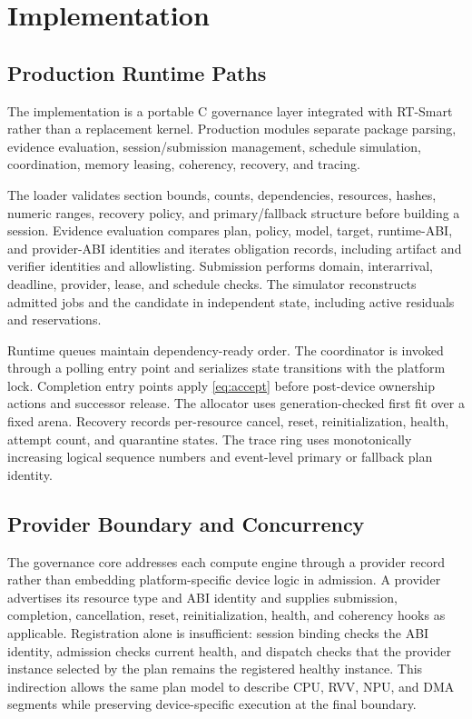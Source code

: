 \documentclass[lettersize,journal]{IEEEtran}
\begin{document}
\section{Implementation}
\subsection{Production Runtime Paths}
The implementation is a portable C governance layer integrated with RT-Smart
rather than a replacement kernel. Production modules separate package parsing,
evidence evaluation, session/submission management, schedule simulation,
coordination, memory leasing, coherency, recovery, and tracing.

The loader validates section bounds, counts, dependencies, resources, hashes,
numeric ranges, recovery policy, and primary/fallback structure before building
a session. Evidence evaluation compares plan, policy, model, target,
runtime-ABI, and provider-ABI identities and iterates obligation records,
including artifact and verifier identities and allowlisting. Submission
performs domain, interarrival, deadline, provider, lease, and schedule checks.
The simulator reconstructs admitted jobs and the candidate in independent
state, including active residuals and reservations.

Runtime queues maintain dependency-ready order. The coordinator is invoked
through a polling entry point and serializes state transitions with the
platform lock. Completion entry points apply \cref{eq:accept} before
post-device ownership actions and successor release. The allocator uses
generation-checked first fit over a fixed arena. Recovery records per-resource
cancel, reset, reinitialization, health, attempt count, and quarantine states.
The trace ring uses monotonically increasing logical sequence numbers and
event-level primary or fallback plan identity.

\subsection{Provider Boundary and Concurrency}
The governance core addresses each compute engine through a provider record
rather than embedding platform-specific device logic in admission. A provider
advertises its resource type and ABI identity and supplies submission,
completion, cancellation, reset, reinitialization, health, and coherency hooks
as applicable. Registration alone is insufficient: session binding checks the
ABI identity, admission checks current health, and dispatch checks that the
provider instance selected by the plan remains the registered healthy instance.
This indirection allows the same plan model to describe CPU, RVV, NPU, and DMA
segments while preserving device-specific execution at the final boundary.
\end{document}
